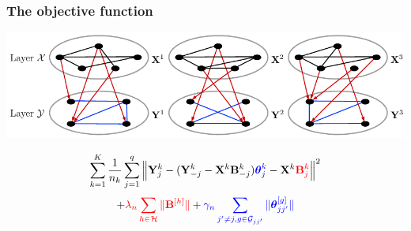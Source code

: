 \documentclass[10pt]{beamer}
\theoremstyle{definition}
\DeclareMathOperator*{\Tr}{Tr}
\DeclareMathOperator*{\argmin}{argmin}
\begin{document}
\begin{frame}
\frametitle{The objective function}

\begin{center}
\includegraphics[width=.9\textwidth]{multitwolayer}
\end{center}

$$
\sum_{k=1}^K \frac{1}{n_k} \sum_{j=1}^q
\left\| {\mathbf{Y}}_j^k - ({\mathbf{Y}}_{-j}^k - {\mathbf{X}}^k {\mathbf{B}}_{-j}^k) {\color{blue}  {\boldsymbol{\theta}}_j^k}
- {\mathbf{X}}^k {\color{red} {\mathbf{B}}_j^k } \right\|^2
$$
$$
+ {\color{red} \lambda_n \sum_{h \in {\cal{H}}} \| {\mathbf{B}}^{[h]} \|}
+ {\color{blue} \gamma_n \sum_{j' \neq j, g \in {\cal{G}}_{jj'}} \| {\boldsymbol{\theta}}_{jj'}^{[g]} \|}
$$
\end{frame}
%
%
%
%
%
%
\end{document}
